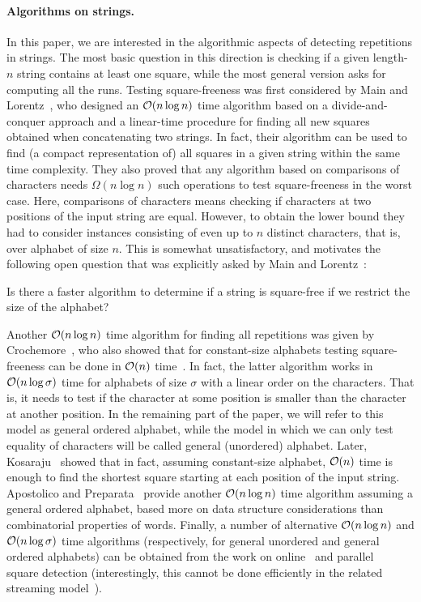 \paragraph{Algorithms on strings. }
In this paper, we are interested in the algorithmic aspects of detecting repetitions in strings. The most basic question
in this direction is checking if a given length-$n$ string contains at least one square,
while the most general version asks for computing all the runs.
Testing square-freeness was
first considered by Main and Lorentz~\cite{Main1984}, who designed an $\mathcal{O}(n\log n)$ time algorithm based on
a divide-and-conquer approach and a linear-time procedure for finding all new squares obtained when concatenating
two strings. In fact, their algorithm can be used to find (a compact representation of) all squares in a given string
within the same time complexity. They also proved that any algorithm based on comparisons of characters needs
$\Omega(n\log n)$ such operations to test square-freeness in the worst case. Here, comparisons of characters means
checking if characters at two positions of the input string are equal. However, to obtain the lower bound they
had to consider instances consisting of even up to $n$ distinct characters, that is, over alphabet of size $n$.
This is somewhat unsatisfactory, and motivates the following open question that was explicitly asked by Main and Lorentz~\cite{Main1984}:

\begin{question}
Is there a faster algorithm to determine if a string is square-free if we restrict the size of the alphabet?
\end{question}

Another $\mathcal{O}(n\log n)$ time algorithm for finding all repetitions was given by Crochemore~\cite{Crochemore1981},
who also showed that for constant-size alphabets testing square-freeness can be done in  $\mathcal{O}(n)$ time~\cite{Crochemore1986}.
In fact, the latter algorithm works in $\mathcal{O}(n\log \sigma)$ time for alphabets of size $\sigma$ with a linear order on the characters.
That is, it needs to test if the character at some position is smaller than the character at another position.
In the remaining part of the paper, we will refer to this model as general ordered alphabet, while the model
in which we can only test equality of characters will be called general (unordered) alphabet.
Later, Kosaraju~\cite{Kosaraju1994} showed that in fact, assuming constant-size alphabet, $\mathcal{O}(n)$ time is enough
to find the shortest square starting at each position of the input string.
Apostolico and Preparata~\cite{Apostolico1983} provide another $\mathcal{O}(n\log n)$ time algorithm assuming a general ordered alphabet,
based more on data structure considerations than combinatorial properties of words.
Finally, a number of alternative $\mathcal{O}(n\log n)$ and $\mathcal{O}(n\log \sigma)$ time algorithms (respectively, for general unordered
and general ordered alphabets) can be obtained from the work on online~\cite{Hong2008,Kosolobov2014,Kosolobov2015a}
and parallel~\cite{Apostolico1996} square detection (interestingly, this cannot be done efficiently in the related
streaming model~\cite{Merkurev2019,Merkurev2022}).

